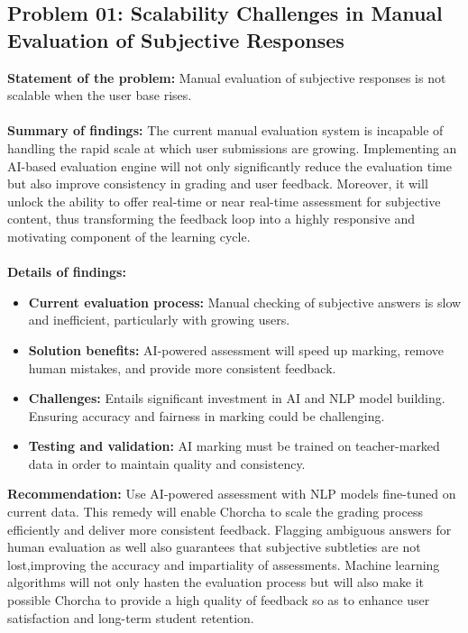 \documentclass[12pt,a4paper,oneside]{book}
\begin{document}
\subsection{Problem 01: Scalability Challenges in Manual Evaluation of Subjective Responses}
\textbf{Statement of the problem:} Manual evaluation of subjective responses is not scalable when the user base rises.\\ \\
\textbf{Summary of findings:} The current manual evaluation system is incapable of handling the rapid scale at which user submissions are growing. Implementing an AI-based evaluation engine will not only significantly reduce the evaluation time but also improve consistency in grading and user feedback. Moreover, it will unlock the ability to offer real-time or near real-time assessment for subjective content, thus transforming the feedback loop into a highly responsive and motivating component of the learning cycle.
\\ \\
\textbf{Details of findings:}
\begin{itemize}
    \item \textbf{Current evaluation process:} Manual checking of subjective answers is slow and inefficient, particularly with growing users.
    \item \textbf{Solution benefits:} AI-powered assessment will speed up marking, remove human mistakes, and provide more consistent feedback.
    \item \textbf{Challenges:} Entails significant investment in AI and NLP model building. Ensuring accuracy and fairness in marking could be challenging.

    \item \textbf{Testing and validation:} AI marking must be trained on teacher-marked data in order to maintain quality and consistency.
\end{itemize}
\textbf{Recommendation:} Use AI-powered assessment with NLP models fine-tuned on current data. This remedy will enable Chorcha to scale the grading process efficiently and deliver more consistent feedback. Flagging ambiguous answers
for human evaluation as well also guarantees that subjective subtleties are not lost,improving the accuracy and impartiality of assessments. Machine learning algorithms will not only hasten the evaluation process but will also make it possible Chorcha to provide a high quality of feedback so as to enhance user satisfaction and long-term student retention.
\end{document}
